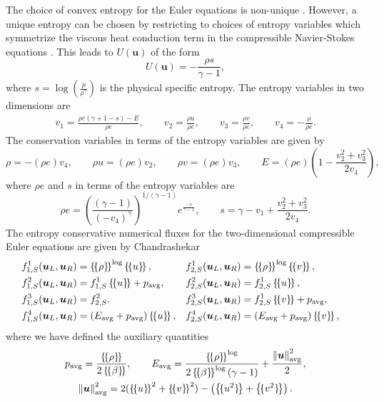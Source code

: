 \documentclass[10pt]{amsart}
\theoremstyle{definition}
\theoremstyle{lemma}
\theoremstyle{theorem}
\theoremstyle{assumption}
\newcommand{\nor}[1]{\left\| #1 \right\|}
\newcommand{\LRp}[1]{\left( #1 \right)}
\newcommand{\LRc}[1]{\left\{ #1 \right\}}
\newcommand{\avg}[1] {\ensuremath{\LRc{\!\{#1\}\!}}}
\begin{document}
{The choice of convex entropy for the Euler equations is non-unique \cite{harten1983symmetric}.  However, a unique entropy can be chosen by restricting to choices of entropy variables which symmetrize the viscous heat conduction term in the compressible Navier-Stokes equations \cite{hughes1986new}.  This leads to $U(\bm{u})$ of the form
\begin{equation}
U(\bm{u}) = -\frac{\rho s}{\gamma-1},
\label{eq:entropy2d}
\end{equation}
where $s = \log\LRp{\frac{p}{\rho^\gamma}}$ is the physical specific entropy. The entropy variables in two dimensions are 
\begin{align}
v_1 = \frac{\rho e (\gamma + 1 - s) - E}{\rho e}, \qquad v_2 = \frac{\rho u}{\rho e}, \qquad v_3 = \frac{\rho v}{\rho e}, \qquad v_4 = -\frac{\rho}{\rho e}.
\end{align}
The conservation variables in terms of the entropy variables are given by
\begin{equation}
\rho = -(\rho e) v_4, \qquad \rho u = (\rho e) v_2, \qquad \rho v = (\rho e) v_3, \qquad E = (\rho e)\LRp{1 - \frac{{v_2^2+v_3^2}}{2 v_4}},
\end{equation}
where $\rho e$ and $s$ in terms of the entropy variables are 
\begin{equation}
\rho e = \LRp{\frac{(\gamma-1)}{\LRp{-v_4}^{\gamma}}}^{1/(\gamma-1)}e^{\frac{-s}{\gamma-1}}, \qquad s = \gamma - v_1 + \frac{{v_2^2+v_3^2}}{2v_4}.
\end{equation}
The entropy conservative numerical fluxes for the two-dimensional compressible Euler equations are given by Chandrashekar \cite{chandrashekar2013kinetic}
\begin{align}
&f^1_{1,S}(\bm{u}_L,\bm{u}_R) = \avg{\rho}^{\log} \avg{u},& &f^1_{2,S}(\bm{u}_L,\bm{u}_R) = \avg{\rho}^{\log} \avg{v},&\\
&f^2_{1,S}(\bm{u}_L,\bm{u}_R) = f^1_{1,S} \avg{u} + p_{\rm avg},&  &f^2_{2,S}(\bm{u}_L,\bm{u}_R) = f^1_{2,S} \avg{u},&\nonumber\\
&f^3_{1,S}(\bm{u}_L,\bm{u}_R) = f^2_{2,S},& &f^3_{2,S}(\bm{u}_L,\bm{u}_R) = f^1_{2,S} \avg{v} + p_{\rm avg},&\nonumber\\
&f^4_{1,S}(\bm{u}_L,\bm{u}_R) = \LRp{E_{\rm avg} + p_{\rm avg}}\avg{u},& &f^4_{2,S}(\bm{u}_L,\bm{u}_R) = \LRp{E_{\rm avg} + p_{\rm avg} }\avg{v},& \nonumber
\end{align}
where we have defined the auxiliary quantities 
\begin{gather}
p_{\rm avg} = \frac{\avg{\rho}}{2\avg{\beta}}, \qquad E_{\rm avg} = \frac{\avg{\rho}^{\log}}{2\avg{\beta}^{\log}\LRp{\gamma -1}}   + \frac{\nor{\bm{u}}^2_{\rm avg}}{2}, \\
 \nor{\bm{u}}^2_{\rm avg} = 2(\avg{u}^2 + \avg{v}^2) - \LRp{\avg{u^2} +\avg{v^2}} \nonumber.  
\end{gather}

}
\end{document}
